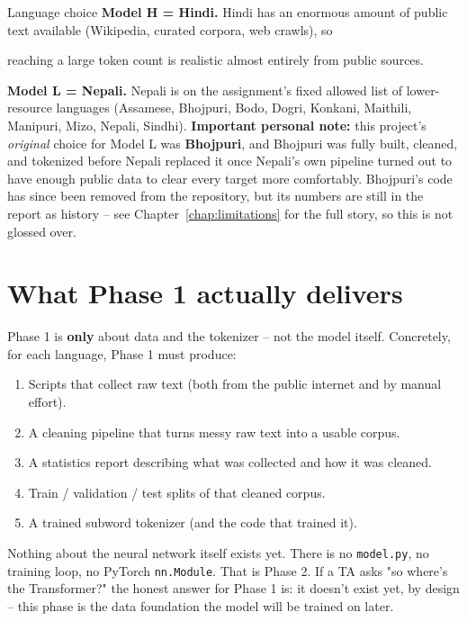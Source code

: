 \documentclass[11pt]{report}
\begin{document}
\begin{implementation}{Language choice}
\textbf{Model H = Hindi.} Hindi has an enormous amount of public text
available (Wikipedia, curated corpora, web crawls), so \raggedright reaching a large
token count is realistic almost entirely from public sources.

\textbf{Model L = Nepali.} Nepali is on the assignment's fixed allowed
list of lower-resource languages (Assamese, Bhojpuri, Bodo, Dogri,
Konkani, Maithili, Manipuri, Mizo, Nepali, Sindhi). \textbf{Important
personal note:} this project's \textit{original} choice for Model L was
\textbf{Bhojpuri}, and Bhojpuri was fully built, cleaned, and tokenized
before Nepali replaced it once Nepali's own pipeline turned out to have
enough public data to clear every target more comfortably. Bhojpuri's
code has since been removed from the repository, but its numbers are
still in the report as history -- see Chapter~\ref{chap:limitations} for
the full story, so this is not glossed over.
\end{implementation}

\section{What Phase 1 actually delivers}

Phase 1 is \textbf{only} about data and the tokenizer -- not the model
itself. Concretely, for each language, Phase 1 must produce:

\begin{enumerate}
\item Scripts that collect raw text (both from the public internet and by
manual effort).
\item A cleaning pipeline that turns messy raw text into a usable corpus.
\item A statistics report describing what was collected and how it was
cleaned.
\item Train / validation / test splits of that cleaned corpus.
\item A trained subword tokenizer (and the code that trained it).
\end{enumerate}

\begin{notebox}
Nothing about the neural network itself exists yet. There is no
\texttt{model.py}, no training loop, no PyTorch \texttt{nn.Module}. That
is Phase 2. If a TA asks "so where's the Transformer?" the honest answer
for Phase 1 is: it doesn't exist yet, by design -- this phase is the data
foundation the model will be trained on later.
\end{notebox}
\end{document}
